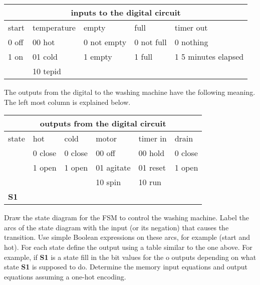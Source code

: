 \begin{enumerate}
        \begin{tabular}{|l|l|l|l|l|} \hline
            \multicolumn{5}{|c|}{inputs to the digital circuit}        \\ \hline \hline
            start & temperature & empty       & full       & timer out     \\ \hline
            0 off & 00 hot      & 0 not empty & 0 not full & 0 nothing    \\ \hline
            1 on  & 01 cold     & 1 empty     & 1 full     & 1 5 minutes elapsed     \\ \hline
            & 10 tepid    &          &           &        \\ \hline
        \end{tabular}

        The outputs from the digital to the washing machine have the following meaning.
        The left most column is explained below.

        \begin{tabular}{|l|||l|l|l|l|l|} \hline
            \multicolumn{6}{|c|}{outputs from the digital circuit}            \\ \hline \hline
            state & hot     & cold    & motor      & timer in   & drain     \\ \hline
            & 0 close & 0 close & 00 off     & 00 hold    & 0 close    \\ \hline
            & 1 open  & 1 open  & 01 agitate & 01 reset   & 1 open    \\ \hline
            &        &         & 10 spin    & 10 run     &        \\ \hline \hline
            \textbf{ S1}    &    &      &           &        &        \\ \hline
        \end{tabular}

        Draw the state diagram for the FSM to control the washing machine.
        Label the arcs of the state diagram with the input (or its negation)
        that causes the transition.  Use simple Boolean expressions on these
        arcs, for example (start and hot).
        For each state define the output using a table similar to the one above.
        For example, if \textbf{ S1} is a state fill in the bit values for the o
        outputs depending on what state \textbf{ S1} is supposed to do.
        Determine the memory input equations and output equations assuming a one-hot
        encoding.


\end{enumerate}
